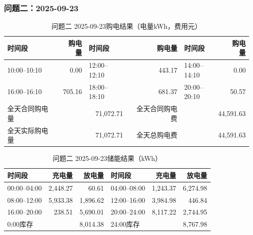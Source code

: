\par\medskip
\par\noindent\begin{minipage}{\textwidth}
\subsubsection*{问题二：2025-09-23}
\begin{table}[H]\centering\small\setlength{\tabcolsep}{4pt}\caption{问题二 2025-09-23购电结果（电量kWh，费用元）}
\begin{tabular}{lr lr lr}\toprule
时间段 & 购电量 & 时间段 & 购电量 & 时间段 & 购电量\\\midrule
10:00--10:10 & 0.00 & 12:00--12:10 & 443.17 & 14:00--14:10 & 0.00\\
16:00--16:10 & 705.16 & 18:00--18:10 & 681.37 & 20:00--20:10 & 50.57\\
\midrule
全天合同购电量 & \multicolumn{2}{r}{71,072.71} & 全天合同购电费 & \multicolumn{2}{r}{44,591.63}\\
全天实际购电量 & \multicolumn{2}{r}{71,072.71} & 全天总购电费 & \multicolumn{2}{r}{44,591.63}\\
\bottomrule\end{tabular}\end{table}
\begin{table}[H]\centering\small\setlength{\tabcolsep}{4pt}\caption{问题二 2025-09-23储能结果（kWh）}
\begin{tabular}{lrr lrr}\toprule
时间段 & 充电量 & 放电量 & 时间段 & 充电量 & 放电量\\\midrule
00:00--04:00 & 2,448.27 & 60.61 & 04:00--08:00 & 1,243.37 & 6,274.98\\
08:00--12:00 & 5,933.38 & 1,896.62 & 12:00--16:00 & 3,984.98 & 446.84\\
16:00--20:00 & 238.51 & 5,690.01 & 20:00--24:00 & 8,117.22 & 2,744.95\\
\midrule
0:00库存 & \multicolumn{2}{r}{8,014.38} & 24:00库存 & \multicolumn{2}{r}{8,767.98}\\
\bottomrule\end{tabular}\end{table}
\end{minipage}\par

